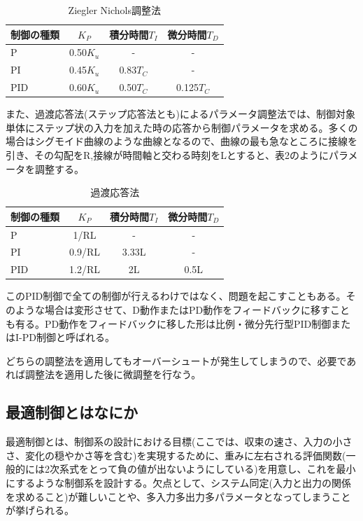 \documentclass[a4j,twoside,openright,11pt]{jarticle}
\begin{document}
\begin{table}[htb]
\begin{center}
  \caption{Ziegler Nichols調整法}
  \begin{tabular}{|l||c|c|c|} \hline
制御の種類&$K_P$     &積分時間$T_I$    &微分時間$T_D$\\
\hline
P        &0.50$K_u$ &-        &-\\
PI       &0.45$K_u$ &0.83$T_C$&-\\
PID      &0.60$K_u$ &0.50$T_C$&0.125$T_C$\\
\hline
  \end{tabular}
\end{center}
\end{table}

また、過渡応答法(ステップ応答法とも)によるパラメータ調整法では、制御対象単体にステップ状の入力を加えた時の応答から制御パラメータを求める。多くの場合はシグモイド曲線のような曲線となるので、曲線の最も急なところに接線を引き、その勾配をR,接線が時間軸と交わる時刻をLとすると、表2のようにパラメータを調整する。\begin{table}[htb]
\begin{center}
  \caption{過渡応答法}
  \begin{tabular}{|l||c|c|c|} \hline
制御の種類&$K_P$     &積分時間$T_I$    &微分時間$T_D$\\
\hline
P        &  1/RL &-        &-\\
PI       &0.9/RL &3.33L    &-\\
PID      &1.2/RL &2L       &0.5L\\
\hline
  \end{tabular}
\end{center}
\end{table}
このPID制御で全ての制御が行えるわけではなく、問題を起こすこともある。そのような場合は変形させて、D動作またはPD動作をフィードバックに移すことも有る。PD動作をフィードバックに移した形は比例・微分先行型PID制御またはI-PD制御と呼ばれる。
\par
どちらの調整法を適用してもオーバーシュートが発生してしまうので、必要であれば調整法を適用した後に微調整を行なう。
\subsection{最適制御とはなにか}
最適制御とは、制御系の設計における目標(ここでは、収束の速さ、入力の小ささ、変化の穏やかさ等を含む)を実現するために、重みに左右される評価関数(一般的には2次系式をとって負の値が出ないようにしている)を用意し、これを最小にするような制御系を設計する。欠点として、システム同定(入力と出力の関係を求めること)が難しいことや、多入力多出力多パラメータとなってしまうことが挙げられる。
\end{document}
